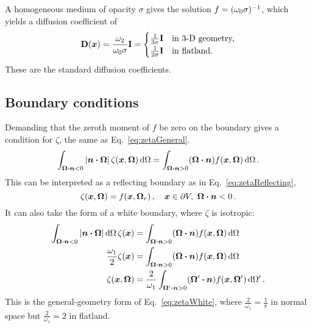 A homogeneous medium of opacity $\sigma$ gives the solution
$f=(\omega_0\sigma)^{-1}$, which yields a diffusion coefficient of
\begin{equation*}
  \mathbf{D}(\bm{x}) = \frac{\omega_2}{\omega_0 \sigma} \mathbf{I}
  =
  \begin{cases}
    \frac{1}{3\sigma} \mathbf{I} & \text{in 3-D geometry,} \\ 
    \frac{1}{2\sigma} \mathbf{I} & \text{in flatland.}
  \end{cases}
\end{equation*}
These are the standard diffusion coefficients.

\subsection{Boundary conditions}

Demanding that the zeroth moment of $f$ be zero on the boundary gives a
condition for $\zeta$, the same as Eq.~\eqref{eq:zetaGeneral}.
\begin{equation*}
  \int_{\bm{\Omega} \bm{\cdot} \bm{n} < 0}
  \left| \bm{n} \bm{\cdot} \bm{\Omega} \right| \zeta(\bm{x}, \bm{\Omega}) \mathop{}\!\mathrm{d}\Omega
  = \int_{\bm{\Omega} \bm{\cdot} \bm{n} > 0}
  (\bm{\Omega} \bm{\cdot} \bm{n} ) f(\bm{x}, \bm{\Omega}) \mathop{}\!\mathrm{d}\Omega\,.  
\end{equation*}
This can be interpreted as a reflecting boundary as in
Eq.~\eqref{eq:zetaReflecting}, 
\begin{equation*}
  \zeta(\bm{x}, \bm{\Omega}) = f(\bm{x}, \bm{\Omega}_r) \,,
 \quad \bm{x} \in \partial V, \ \bm{\Omega} \bm{\cdot} \bm{n} < 0 \,.
\end{equation*}
It can also take the form of a white boundary, where $\zeta$ is isotropic:
\begin{align*}
  \int_{\bm{\Omega} \bm{\cdot} \bm{n} < 0}
  \left| \bm{n} \bm{\cdot} \bm{\Omega} \right| \mathop{}\!\mathrm{d}\Omega\, \zeta(\bm{x}) 
  &= \int_{\bm{\Omega} \bm{\cdot} \bm{n} > 0}
  (\bm{\Omega} \bm{\cdot} \bm{n} ) f(\bm{x}, \bm{\Omega}) \mathop{}\!\mathrm{d}\Omega
  \\
  \frac{\omega_1}{2} \zeta(\bm{x}) 
  &= \int_{\bm{\Omega} \bm{\cdot} \bm{n} > 0}
  (\bm{\Omega} \bm{\cdot} \bm{n} ) f(\bm{x}, \bm{\Omega}) \mathop{}\!\mathrm{d}\Omega
  \\
  \zeta(\bm{x},\bm{\Omega})
  &= \frac{2}{\omega_1} \int_{\bm{\Omega}' \bm{\cdot} \bm{n} > 0}
  (\bm{\Omega}' \bm{\cdot} \bm{n} ) f(\bm{x}, \bm{\Omega}') \mathop{}\!\mathrm{d}\Omega'\,.
\end{align*}
This is the general-geometry form of Eq.~\eqref{eq:zetaWhite}, where
$\frac{2}{\omega_1}=\frac{1}{\pi}$ in normal space but $\frac{2}{\omega_1}=2$ in
flatland.

